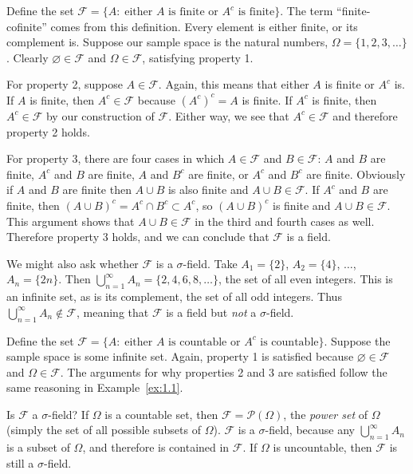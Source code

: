 \documentclass[11pt,fleqn]{book} %
\begin{document}
\begin{example} \label{ex:1.1}
	Define the set $\mathcal{F} = \{A:\;\textrm{either $A$ is finite or $A^c$ is finite}\}$. The term ``finite-cofinite'' comes from this definition. Every element is either finite, or its complement is. Suppose our sample space is the natural numbers, $\Omega = \{1,2,3,\dots\}$. Clearly $\varnothing \in \mathcal{F}$ and $\Omega \in \mathcal{F}$, satisfying property 1.

	For property 2, suppose $A \in \mathcal{F}$. Again, this means that either $A$ is finite or $A^c$ is. If $A$ is finite, then $A^c \in \mathcal{F}$ because $(A^c)^c = A$ is finite. If $A^c$ is finite, then $A^c \in \mathcal{F}$ by our construction of $\mathcal{F}$. Either way, we see that $A^c \in \mathcal{F}$ and therefore property 2 holds.

	For property 3, there are four cases in which $A \in \mathcal{F}$ and $B \in \mathcal{F}$: $A$ and $B$ are finite, $A^c$ and $B$ are finite, $A$ and $B^c$ are finite, or $A^c$ and $B^c$ are finite. Obviously if $A$ and $B$ are finite then $A \cup B$ is also finite and $A \cup B \in \mathcal{F}$. If $A^c$ and $B$ are finite, then $(A \cup B)^c = A^c \cap B^c \subset A^c$, so $(A \cup B)^c$ is finite and $A \cup B \in \mathcal{F}$. This argument shows that $A \cup B \in \mathcal{F}$ in the third and fourth cases as well. Therefore property 3 holds, and we can conclude that $\mathcal{F}$ is a field.

	We might also ask whether $\mathcal{F}$ is a $\sigma$-field. Take $A_1 = \{2\}$, $A_2 = \{4\}$, $\dots$, $A_n = \{2n\}$. Then $\bigcup_{n=1}^\infty A_n = \{2,4,6,8,\dots\}$, the set of all even integers. This is an infinite set, as is its complement, the set of all odd integers. Thus $\bigcup_{n=1}^\infty A_n \notin \mathcal{F}$, meaning that $\mathcal{F}$ is a field but \emph{not} a $\sigma$-field.
\end{example}

\begin{example} \label{ex:1.2}
	Define the set $\mathcal{F} = \{A:\;\textrm{either $A$ is countable}$ $\textrm{or $A^c$ is countable}\}$. Suppose the sample space is some infinite set. Again, property 1 is satisfied because $\varnothing \in \mathcal{F}$ and $\Omega \in \mathcal{F}$. The arguments for why properties 2 and 3 are satisfied follow the same reasoning in Example~\ref{ex:1.1}.

	Is $\mathcal{F}$ a $\sigma$-field? If $\Omega$ is a countable set, then $\mathcal{F} = \mathcal{P}(\Omega)$, the \emph{power set} of $\Omega$ (simply the set of all possible subsets of $\Omega$). $\mathcal{F}$ is a $\sigma$-field, because any $\bigcup_{n=1}^\infty A_n$ is a subset of $\Omega$, and therefore is contained in $\mathcal{F}$. If $\Omega$ is uncountable, then $\mathcal{F}$ is still a $\sigma$-field.
\end{example}
\end{document}
